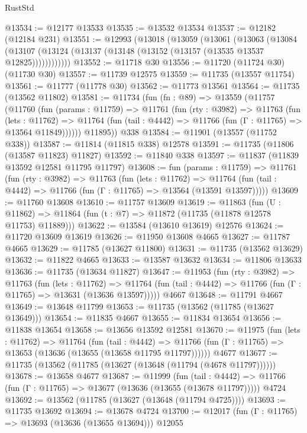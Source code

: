 \begin{lexlean}{RustStd}
\begin{coremodule}
@13534 := @12177 @13533
@13535 := @13532 @13534
@13537 := @12182 (@12184 @231)
@13551 := @12993
    (@13018
      (@13059
        (@13061
          (@13063
            (@13084
              (@13107 (@13124 (@13137 (@13148 (@13152 (@13157 (@13535 @13537 @12825))))))))))))
@13552 := @11718 @30
@13556 := @11720 (@11724 @30) (@11730 @30)
@13557 := @11739 @12575
@13559 := @11735 (@13557 @11754)
@13561 := @11777 (@11778 @30)
@13562 := @11773 @13561
@13564 := @11735 (@13562 @11802)
@13581 := @11734
    (fun (fn : @89) =>
    @13559
      (@11757
        (@11760
          (fun (params : @11759) =>
          @11761
            (fun (rty : @3982) =>
            @11763
              (fun (lets : @11762) =>
              @11764 (fun (tail : @4442) => @11766 (fun (Γ : @11765) => @13564 @11849))))))
        @11895))
    @338
@13584 := @11901 (@13557 (@11752 @338))
@13587 := @11814 (@11815 @338) @12578
@13591 := @11735 (@11806 (@13587 @11823) @11827)
@13592 := @11840 @338
@13597 := @11837 (@11839 @13592 @12581 @11795 @11797)
@13608 := fun (params : @11759) =>
  @11761
    (fun (rty : @3982) =>
    @11763
      (fun (lets : @11762) =>
      @11764 (fun (tail : @4442) => @11766 (fun (Γ : @11765) => @13564 (@13591 @13597)))))
@13609 := @11760 @13608
@13610 := @11757 @13609
@13619 := @11863
    (fun (U : @11862) => @11864 (fun (t : @7) => @11872 (@11735 (@11878 @12578 @11753) @11889)))
@13622 := @13584 (@13610 @13619) @12576
@13624 := @11720 @13609 @13619
@13626 := @11950 @13608 @4665
@13627 := @11787 @4665
@13629 := @11785 (@13627 @11800)
@13631 := @11735 (@13562 @13629)
@13632 := @11822 @4665
@13633 := @13587 @13632
@13634 := @11806 @13633
@13636 := @11735 (@13634 @11827)
@13647 := @11953
    (fun (rty : @3982) =>
    @11763
      (fun (lets : @11762) =>
      @11764 (fun (tail : @4442) => @11766 (fun (Γ : @11765) => @13631 (@13636 @13597)))))
    @4667
@13648 := @11791 @4667
@13649 := @13648 @11799
@13653 := @11735 (@13562 (@11785 (@13627 @13649)))
@13654 := @11835 @4667
@13655 := @11834 @13654
@13656 := @11838 @13654
@13658 := @13656 @13592 @12581
@13670 := @11975
    (fun (lets : @11762) =>
    @11764
      (fun (tail : @4442) =>
      @11766 (fun (Γ : @11765) => @13653 (@13636 (@13655 (@13658 @11795 @11797))))))
    @4677
@13677 := @11735 (@13562 (@11785 (@13627 (@13648 (@11794 (@4678 @11797))))))
@13678 := @13658 @4677
@13687 := @11999
    (fun (tail : @4442) => @11766 (fun (Γ : @11765) => @13677 (@13636 (@13655 (@13678 @11797)))))
    @4724
@13692 := @13562 (@11785 (@13627 (@13648 (@11794 @4725))))
@13693 := @11735 @13692
@13694 := @13678 @4724
@13700 := @12017 (fun (Γ : @11765) => @13693 (@13636 (@13655 @13694))) @12055

\end{coremodule}
\end{lexlean}
